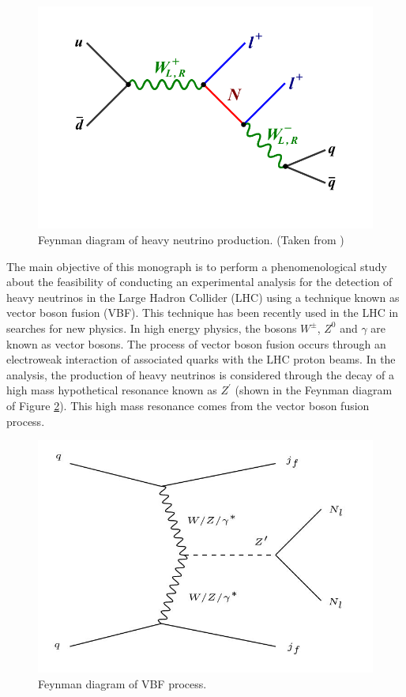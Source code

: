 \begin{figure}[H]
\centering
\includegraphics[width=\linewidth]{Figures/Feynman_W.png}
\caption{Feynman diagram of heavy neutrino production. (Taken from \cite{CMS ATLAS})}
\label{fig: W}
\end{figure}

The main objective of this monograph is to perform a phenomenological study about the feasibility of conducting an experimental analysis for the detection of heavy neutrinos in the Large Hadron Collider (LHC) using a technique known as vector boson fusion (VBF). This technique has been recently used in the LHC \cite{VBF Search} in searches for new physics. In high energy physics, the bosons $W^{\pm}$, $Z^{0}$ and $\gamma$ are known as vector bosons. The process of vector boson fusion occurs through an electroweak interaction of associated quarks with the LHC proton beams. In the analysis, the production of heavy neutrinos is considered through the decay of a high mass hypothetical resonance known as $Z^{'}$ (shown in the Feynman diagram of Figure \ref{fig: VBF}). This high mass resonance comes from the vector boson fusion process.

\begin{figure}[H]
\centering
\includegraphics[scale = 0.65]{Figures/Feynman_VBF.JPG}
\caption{Feynman diagram of VBF process.}
\label{fig: VBF}
\end{figure}

